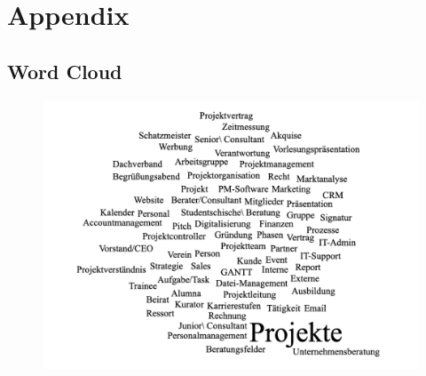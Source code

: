 \documentclass[a4paper, DIV=13, BCOR=0cm]{scrbook}
\begin{document}
\appendix
\chapter{Appendix  }
\printbibliography
\clearpage

\section{Word Cloud}
\label{word-cloud}
\begin{figure}[h]
	\centering
	\includegraphics[width=\textwidth]{Images/word-cloud.png}
\end{figure}
\clearpage
\end{document}

